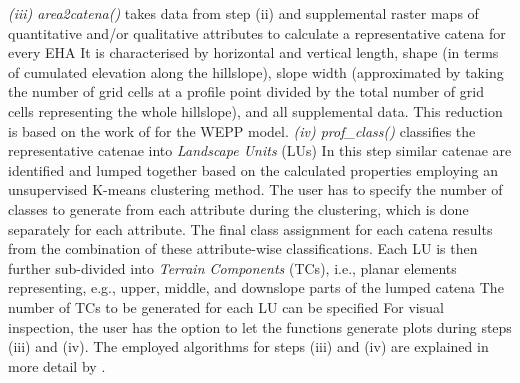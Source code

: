 \emph{(iii) area2catena()} takes data from step (ii) and supplemental raster maps of quantitative and/or qualitative attributes to calculate a representative catena for every EHA \DIFdelbegin {}\DIFdelend \DIFaddbegin {}\DIFaddend It is characterised by horizontal and vertical length, shape (in terms of cumulated elevation along the hillslope), slope width (approximated by taking the number of grid cells at a profile point divided by the total number of grid cells representing the whole hillslope), and all supplemental data.
This reduction is based on the work of \citet{Cochrane2003} for the WEPP model.
\emph{(iv) prof\_class()} classifies the representative catenae into \emph{Landscape Units} (LUs) \DIFdelbegin {}\DIFdelend \DIFaddbegin {}\DIFaddend In this step similar catenae are identified and lumped together based on the calculated properties employing an unsupervised K-means clustering method.
The user has to specify the number of classes to generate from each attribute during the clustering, which is done separately for each attribute.
The final class assignment for each catena results from the combination of these attribute-wise classifications.
Each LU is then further sub-divided into \emph{Terrain Components} (TCs), i.e., planar elements representing, e.g., upper, middle, and downslope parts of the lumped catena \DIFdelbegin {}\DIFdelend \DIFaddbegin {}\DIFaddend The number of TCs to be generated for each LU can be specified \DIFdelbegin {}\DIFdelend \DIFaddbegin {}\DIFaddend For visual inspection, the user has the option to let the functions generate plots during steps (iii) and (iv).
The employed algorithms for steps (iii) and (iv) are explained in more detail by \citet{Francke2008}.
\DIFdelbegin {}\DIFdelend 

